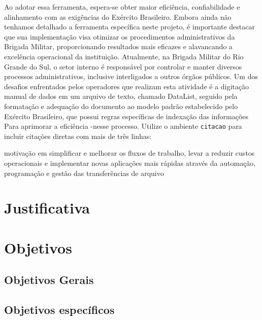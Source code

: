 Ao adotar essa ferramenta, espera-se obter maior eficiência, confiabilidade e alinhamento com as 
exigências do Exército Brasileiro. Embora ainda não tenhamos detalhado a ferramenta específica neste projeto,
é importante destacar que sua implementação visa otimizar os procedimentos administrativos da Brigada Militar, 
proporcionando resultados mais eficazes e alavancando a excelência operacional da instituição.
Atualmente, na Brigada Militar do Rio Grande do Sul, o setor interno é responsável por controlar e 
manter diversos processos administrativos, inclusive interligados a outros órgãos públicos. 
Um dos desafios enfrentados pelos operadores que realizam esta atividade é a digitação manual de dados em um 
arquivo de texto, chamado DataList, seguido pela formatação e adequação do documento ao modelo padrão 
estabelecido pelo Exército Brasileiro, que possui regras específicas de indexação das informações
Para aprimorar a eficiência -nesse processo.
Utilize o ambiente \texttt{citacao} para incluir
citações diretas com mais de três linhas:
\begin{citacao}
motivação em simplificar e melhorar os fluxos de trabalho, levar a reduzir custos operacionais e implementar novas aplicações mais rápidas através da automação, programação e gestão das transferências de arquivo\cite[5.3]{AndradeJunior}
\end{citacao}


\section{Justificativa}

\section{Objetivos}

\subsection{Objetivos Gerais}

\subsection{Objetivos específicos}
